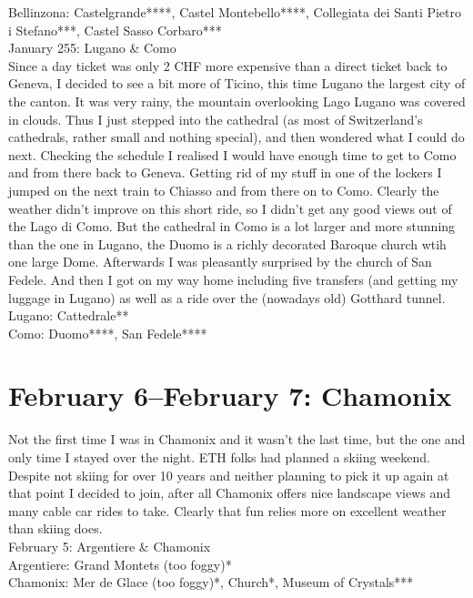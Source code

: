 Bellinzona: Castelgrande****, Castel Montebello****, Collegiata dei Santi Pietro i Stefano***, Castel Sasso Corbaro***\\

January 255: Lugano \& Como\\
Since a day ticket was only 2 CHF more expensive than a direct ticket back to Geneva, I decided to see a bit more of Ticino, this time Lugano the largest city of the canton. It was very rainy, the mountain overlooking Lago Lugano was covered in clouds. Thus I just stepped into the cathedral (as most of Switzerland's cathedrals, rather small and nothing special), and then wondered what I could do next. Checking the schedule I realised I would have enough time to get to Como and from there back to Geneva. Getting rid of my stuff in one of the lockers I jumped on the next train to Chiasso and from there on to Como. Clearly the weather didn't improve on this short ride, so I didn't get any good views out of the Lago di Como. But the cathedral in Como is a lot larger and more stunning than the one in Lugano, the Duomo is a richly decorated Baroque church wtih one large Dome. Afterwards I was pleasantly surprised by the church of San Fedele. And then I got on my way home including five transfers (and getting my luggage in Lugano) as well as a ride over the (nowadays old) Gotthard tunnel.\\

Lugano: Cattedrale**\\
Como: Duomo****, San Fedele****

\section{February 6--February 7: Chamonix}
\label{Chamonix2010}

Not the first time I was in Chamonix and it wasn't the last time, but the one and only time I stayed over the night. ETH folks had planned a skiing weekend. Despite not skiing for over 10 years and neither planning to pick it up again at that point I decided to join, after all Chamonix offers nice landscape views and many cable car rides to take. Clearly that fun relies more on excellent weather than skiing does.\\

February 5: Argentiere \& Chamonix\\
Argentiere: Grand Montets (too foggy)*\\
Chamonix: Mer de Glace (too foggy)*, Church*, Museum of Crystals***\\

